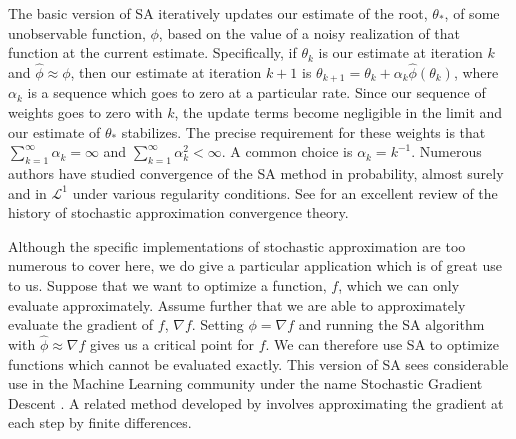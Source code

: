 \documentclass[11pt, oneside]{article}   	%
\begin{document}
The basic version of SA iteratively updates our estimate of the root, $\theta_*$, of some unobservable function, $\phi$, based on the value of a noisy realization of that function at the current estimate. Specifically, if $\theta_k$ is our estimate at iteration $k$ and $\hat{\phi} \approx \phi$, then our estimate at iteration $k+1$ is $\theta_{k+1} = \theta_k + \alpha_k \hat{\phi}(\theta_k)$, where $\alpha_k$ is a sequence which goes to zero at a particular rate. Since our sequence of weights goes to zero with $k$, the update terms become negligible in the limit and our estimate of $\theta_*$ stabilizes. The precise requirement for these weights is that $\sum_{k=1}^\infty \alpha_k = \infty$ and $\sum_{k=1}^\infty \alpha_k^2 < \infty$. A common choice is $\alpha_k = k^{-1}$. Numerous authors have studied convergence of the SA method in probability, almost surely and in $\mathcal{L}^1$ under various regularity conditions. See \citet{Lai03} for an excellent review of the history of stochastic approximation convergence theory.

Although the specific implementations of stochastic approximation are too numerous to cover here, we do give a particular application which is of great use to us. Suppose that we want to optimize a function, $f$, which we can only evaluate approximately. Assume further that we are able to approximately evaluate the gradient of $f$, $\nabla f$. Setting $\phi = \nabla f$ and running the SA algorithm with $\hat{\phi} \approx \nabla f$ gives us a critical point for $f$. We can therefore use SA to optimize functions which cannot be evaluated exactly. This version of SA sees considerable use in the Machine Learning community under the name Stochastic Gradient Descent \citep{Bot10}. A related method developed by \citet{Kie52} involves approximating the gradient at each step by finite differences.
\end{document}
